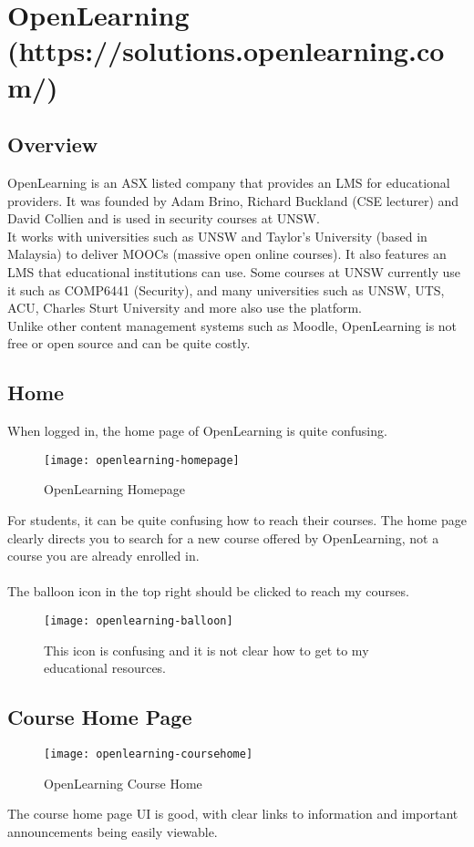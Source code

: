 
\section{OpenLearning (https://solutions.openlearning.com/)}

\subsection{Overview}
OpenLearning is an ASX listed company that provides an LMS for educational providers. It was founded by Adam Brino, Richard Buckland (CSE lecturer) and David Collien and is used in security courses at UNSW\cite{openlearning}.\\
It works with universities such as UNSW and Taylor's University (based in Malaysia) to deliver MOOCs (massive open online courses). It also features an LMS that educational institutions can use. Some courses at UNSW currently use it such as COMP6441 (Security), and many universities such as UNSW, UTS, ACU, Charles Sturt University and more also use the platform.\\
Unlike other content management systems such as Moodle, OpenLearning is not free or open source and can be quite costly\cite{openlearningPricing}.\\

\subsection{Home}
When logged in, the home page of OpenLearning is quite confusing.\\
\begin{figure}[h!]
    \centering
    \texttt{[image: openlearning-homepage]}
    \caption{OpenLearning Homepage}
\end{figure}

For students, it can be quite confusing how to reach their courses. The home page clearly directs you to search for a new course offered by OpenLearning, not a course you are already enrolled in. \\
\\
The balloon icon in the top right should be clicked to reach my courses. \\
\begin{figure}[h!]
    \centering
    \texttt{[image: openlearning-balloon]}
    \caption{This icon is confusing and it is not clear how to get to my educational resources.}
\end{figure}
\newpage    
\subsection{Course Home Page}
\begin{figure}[h!]
    \centering
    \texttt{[image: openlearning-coursehome]}
    \caption{OpenLearning Course Home}
\end{figure}
The course home page UI is good, with clear links to information and important announcements being easily viewable.\\

